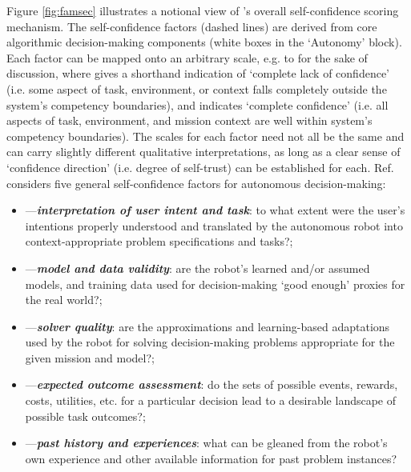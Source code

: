 Figure \ref{fig:famsec} illustrates a notional view of \famsec's overall self-confidence scoring mechanism. The self-confidence factors (dashed lines) are derived from core algorithmic decision-making components (white boxes in the `Autonomy' block).  
Each factor \fi{} can be mapped onto an arbitrary scale, e.g. \flow{} to \fup{} for the sake of discussion, where \flow{} gives a shorthand indication of `complete lack of confidence' (i.e. some aspect of task, environment, or context falls completely outside the system's competency boundaries), and \fup{} indicates `complete confidence' (i.e. all aspects of task, environment, and mission context are well within system's competency boundaries). 
The scales for each factor need not all be the same and can carry slightly different qualitative interpretations, as long as a clear sense of `confidence direction' (i.e. degree of self-trust) can be established for each. Ref. \cite{Aitken2016-cv} considers five general self-confidence factors for autonomous decision-making: %
\begin{itemize}
    \item \xI---\textit{\textbf{interpretation of user intent and task}}: to what extent were the user's intentions properly understood and translated by the autonomous robot into context-appropriate problem specifications and tasks?; 
    \item \xM---\textit{\textbf{model and data validity}}: are the robot's learned and/or assumed models, and training data used for decision-making `good enough' proxies for the real world?; 
    \item \xQ---\textit{\textbf{solver quality}}: are the approximations and learning-based adaptations used by the robot for solving decision-making problems appropriate for the given mission and model?; 
    \item \xO---\textit{\textbf{expected outcome assessment}}: do the sets of possible events, rewards, costs, utilities, etc. for a particular decision lead to a desirable landscape of possible task outcomes?; 
    \item \xP---\textit{\textbf{past history and experiences}}: what can be gleaned from the robot's own experience and other available information for past problem instances? %
\end{itemize}


